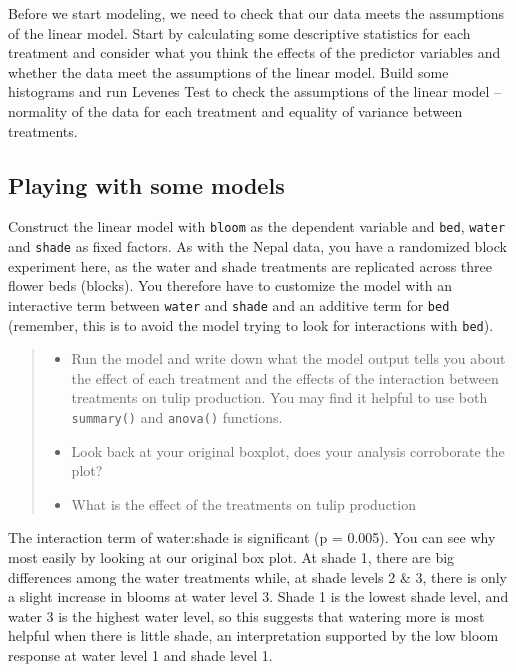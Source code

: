 \documentclass[
]{book}
\providecommand{\tightlist}{%
  \setlength{\itemsep}{0pt}\setlength{\parskip}{0pt}}
\begin{document}
Before we start modeling, we need to check that our data meets the assumptions of the linear model. Start by calculating some descriptive statistics for each treatment and consider what you think the effects of the predictor variables and whether the data meet the assumptions of the linear model. Build some histograms and run Levenes Test to check the assumptions of the linear model -- normality of the data for each treatment and equality of variance between treatments.

\hypertarget{playing-with-some-models}{%
\subsection{Playing with some models}\label{playing-with-some-models}}

Construct the linear model with \texttt{bloom} as the dependent variable and \texttt{bed}, \texttt{water} and \texttt{shade} as fixed factors. As with the Nepal data, you have a randomized block experiment here, as the water and shade treatments are replicated across three flower beds (blocks). You therefore have to customize the model with an interactive term between \texttt{water} and \texttt{shade} and an additive term for \texttt{bed} (remember, this is to avoid the model trying to look for interactions with \texttt{bed}).

\begin{quote}
\begin{itemize}
\tightlist
\item
  Run the model and write down what the model output tells you about the effect of each treatment and the effects of the interaction between treatments on tulip production. You may find it helpful to use both \texttt{summary()} and \texttt{anova()} functions.\\
\item
  Look back at your original boxplot, does your analysis corroborate the plot?
\item
  What is the effect of the treatments on tulip production
\end{itemize}
\end{quote}

The interaction term of water:shade is significant (p = 0.005). You can see why most easily by looking at our original box plot. At shade 1, there are big differences among the water treatments while, at shade levels 2 \& 3, there is only a slight increase in blooms at water level 3. Shade 1 is the lowest shade level, and water 3 is the highest water level, so this suggests that watering more is most helpful when there is little shade, an interpretation supported by the low bloom response at water level 1 and shade level 1.
\end{document}
